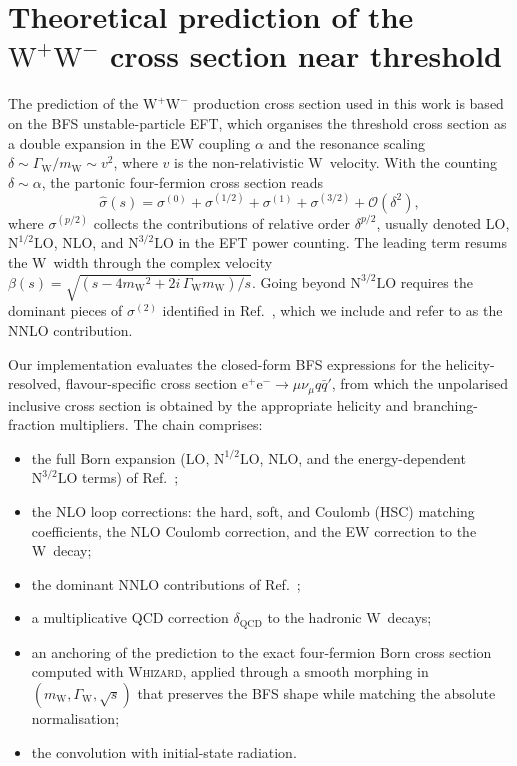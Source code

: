 \documentclass[a4paper,11pt]{article}
\newcommand{\WW}{\ensuremath{\mathrm{W^+W^-}}\xspace}
\newcommand{\sqrts}{\ensuremath{\sqrt{s}}\xspace}
\newcommand{\mW}{\ensuremath{m_\mathrm{W}}\xspace}
\newcommand{\GW}{\ensuremath{\Gamma_\mathrm{W}}\xspace}
\newcommand{\NhalfLO}{\ensuremath{\mathrm{N^{3/2}LO}}\xspace}
\newcommand{\epm}{\ensuremath{\mathrm{e^+e^-}}\xspace}
\begin{document}
\section{Theoretical prediction of the \boldmath \texorpdfstring{\WW}{W+W-} cross section near threshold}
\label{sec:theory}

The prediction of the \WW production cross section used in this work is
based on the BFS unstable-particle EFT, which organises the threshold
cross section as a double expansion in the EW coupling $\alpha$ and the
resonance scaling $\delta\sim\GW/\mW\sim v^2$, where $v$ is the
non-relativistic W~velocity. With the counting $\delta\sim\alpha$, the
partonic four-fermion cross section reads
\begin{equation}
\hat\sigma(s) = \sigma^{(0)} + \sigma^{(1/2)} + \sigma^{(1)} +
   \sigma^{(3/2)} + \mathcal{O}(\delta^2),
\label{eq:bfs-expansion}
\end{equation}
where $\sigma^{(p/2)}$ collects the contributions of relative order
$\delta^{p/2}$, usually denoted LO, $\mathrm{N^{1/2}LO}$, NLO, and
\NhalfLO in the EFT power counting. The leading term resums the W~width
through the complex velocity
$\beta(s)=\sqrt{(s-4\mW^2+2i\,\GW\mW)/s}$. Going beyond \NhalfLO requires
the dominant pieces of $\sigma^{(2)}$ identified in
Ref.~\cite{Actis:2008rb}, which we include and refer to as the NNLO
contribution.

Our implementation evaluates the closed-form BFS expressions for the
helicity-resolved, flavour-specific cross section
$\epm\to\mu\nu_\mu q\bar q'$, from which the unpolarised inclusive cross
section is obtained by the appropriate helicity and branching-fraction
multipliers. The chain comprises:
\begin{itemize}
  \item the full Born expansion (LO, $\mathrm{N^{1/2}LO}$, NLO, and the
        energy-dependent \NhalfLO terms) of Ref.~\cite{Beneke:2007zg};
  \item the NLO loop corrections: the hard, soft, and Coulomb (HSC)
        matching coefficients, the NLO Coulomb correction, and the
        EW correction to the W~decay;
  \item the dominant NNLO contributions of Ref.~\cite{Actis:2008rb};
  \item a multiplicative QCD correction $\delta_\mathrm{QCD}$ to the
        hadronic W~decays;
  \item an anchoring of the prediction to the exact four-fermion Born
        cross section computed with \textsc{Whizard}, applied through a
        smooth morphing in $(\mW,\GW,\sqrts)$ that preserves the BFS
        shape while matching the absolute normalisation;
  \item the convolution with initial-state radiation.
\end{itemize}
\end{document}
